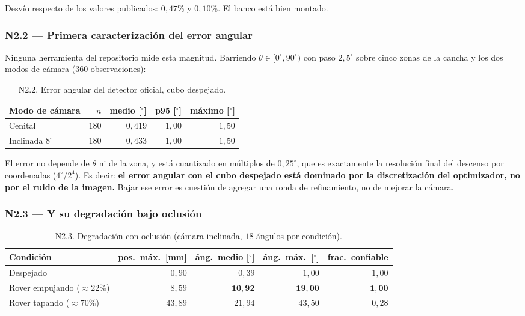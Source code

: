 \documentclass[11pt,a4paper]{article}
\newcommand{\grados}{^{\circ}}
\begin{document}
Desvío respecto de los valores publicados: $0{,}47\%$ y $0{,}10\%$. El banco está bien
montado.

\subsubsection{N2.2 --- Primera caracterización del error angular}

Ninguna herramienta del repositorio mide esta magnitud. Barriendo
$\theta\in[0\grados,90\grados)$ con paso $2{,}5\grados$ sobre cinco zonas de la cancha
y los dos modos de cámara ($360$ observaciones):

\begin{table}[htbp]
\centering
\small
\caption{N2.2. Error angular del detector oficial, cubo despejado.}
\begin{tabular}{lrrrr}
\toprule
Modo de cámara & $n$ & medio [$\grados$] & p95 [$\grados$] & máximo [$\grados$] \\
\midrule
Cenital & $180$ & $0{,}419$ & $1{,}00$ & $1{,}50$ \\
Inclinada $8\grados$ & $180$ & $0{,}433$ & $1{,}00$ & $1{,}50$ \\
\bottomrule
\end{tabular}
\end{table}

El error no depende de $\theta$ ni de la zona, y está cuantizado en múltiplos de
$0{,}25\grados$, que es exactamente la resolución final del descenso por coordenadas
($4\grados/2^4$). Es decir: \textbf{el error angular con el cubo despejado está
dominado por la discretización del optimizador, no por el ruido de la imagen.} Bajar
ese error es cuestión de agregar una ronda de refinamiento, no de mejorar la cámara.

\subsubsection{N2.3 --- Y su degradación bajo oclusión}

\begin{table}[htbp]
\centering
\small
\caption{N2.3. Degradación con oclusión (cámara inclinada, $18$ ángulos por condición).}
\begin{tabular}{lrrrr}
\toprule
Condición & pos.\ máx.\ [mm] & áng.\ medio [$\grados$] & áng.\ máx.\ [$\grados$] & frac.\ confiable \\
\midrule
Despejado & $0{,}90$ & $0{,}39$ & $1{,}00$ & $1{,}00$ \\
Rover empujando ($\approx22\%$) & $8{,}59$ & $\mathbf{10{,}92}$ & $\mathbf{19{,}00}$ & $\mathbf{1{,}00}$ \\
Rover tapando ($\approx70\%$) & $43{,}89$ & $21{,}94$ & $43{,}50$ & $0{,}28$ \\
\bottomrule
\end{tabular}
\end{table}
\end{document}
